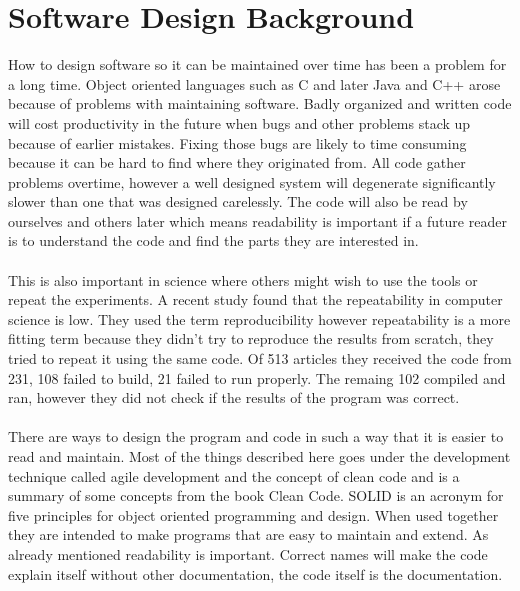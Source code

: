 \documentclass[10pt,a4paper]{report}
\begin{document}
\clearpage
\section{Software Design Background}
How to design software so it can be maintained over time has been a problem for a long time. Object oriented languages such as C and later Java and C++ arose because of problems with maintaining software. Badly organized and written code will cost productivity in the future when bugs and other problems stack up because of earlier mistakes. Fixing those bugs are likely to time consuming because it can be hard to find where they originated from. All code gather problems overtime, however a well designed system will degenerate significantly slower than one that was designed carelessly. The code will also be read by ourselves and others later which means readability is important if a future reader is to understand the code and find the parts they are interested in. \cite{cleancode2008, design_patterns}\\
\\
This is also important in science where others might wish to use the tools or repeat the experiments. A recent study\cite{comp_repro_2013} found that the repeatability in computer science is low. They used the term reproducibility however repeatability is a more fitting term because they didn't try to reproduce the results from scratch, they tried to repeat it using the same code. Of 513 articles they received the code from 231, 108 failed to build, 21 failed to run properly\cite{comp_repro_2013}. The remaing 102 compiled and ran, however they did not check if the results of the program was correct\cite{comp_repro_2013}.\\
\\
There are ways to design the program and code in such a way that it is easier to read and maintain. Most of the things described here goes under the development technique called agile development and the concept of clean code and is a summary of some concepts from the book Clean Code\cite{cleancode2008}. SOLID is an acronym for five principles for object oriented programming and design\cite{cleancode2008}. When used together they are intended to make programs that are easy to maintain and extend\cite{cleancode2008}. As already mentioned readability is important. Correct names will make the code explain itself without other documentation, the code itself is the documentation\cite{cleancode2008}.
\end{document}
